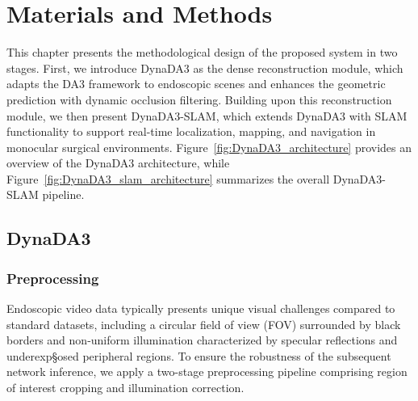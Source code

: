 \chapter{Materials and Methods}
\label{chap:methods}
This chapter presents the methodological design of the proposed system in two stages. First, we introduce DynaDA3 as the dense reconstruction module, which adapts the DA3 framework to endoscopic scenes and enhances the geometric prediction with dynamic occlusion filtering. Building upon this reconstruction module, we then present DynaDA3-SLAM, which extends DynaDA3 with SLAM functionality to support real-time localization, mapping, and navigation in monocular surgical environments. Figure~\ref{fig:DynaDA3_architecture} provides an overview of the DynaDA3 architecture, while Figure~\ref{fig:DynaDA3_slam_architecture} summarizes the overall DynaDA3-SLAM pipeline.
\section{DynaDA3}
\label{sec:network_architecture} 
\subsection{Preprocessing}             
Endoscopic video data typically presents unique visual challenges compared to standard datasets, including a circular field of view (FOV) surrounded by black borders and non-uniform illumination characterized by specular reflections and underexp§osed peripheral regions. 
To ensure the robustness of the subsequent network inference, we apply a two-stage preprocessing pipeline comprising region of interest cropping and illumination correction.


